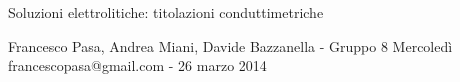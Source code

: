 \documentclass[11pt, twoside, a4paper]{article}
\begin{document}
\begin{center}

        {\huge Soluzioni elettrolitiche: titolazioni conduttimetriche}
    \vspace{0.1cm}

      	{Francesco Pasa, Andrea Miani, Davide Bazzanella - Gruppo 8 Mercoledì} \\
      	{francescopasa@gmail.com - 26 marzo 2014}
    \vspace{-0.2cm}

\end{center}





\end{document}
